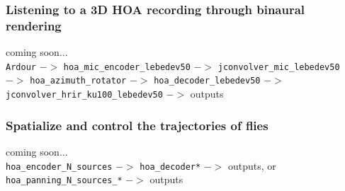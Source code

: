 \documentclass[10pt,a4paper]{article}
\begin{document}
\subsubsection{Listening to a 3D HOA recording through binaural rendering}
coming soon... \\
\lstinline'Ardour' $->$ \lstinline'hoa_mic_encoder_lebedev50' $->$ \lstinline'jconvolver_mic_lebedev50' $->$ \lstinline'hoa_azimuth_rotator' $->$ \lstinline'hoa_decoder_lebedev50' $->$ \lstinline'jconvolver_hrir_ku100_lebedev50' $->$ outputs
\subsubsection{Spatialize and control the trajectories of flies}
coming soon...\\
\lstinline'hoa_encoder_N_sources' $->$ \lstinline'hoa_decoder*' $->$ outputs, or \\
\lstinline'hoa_panning_N_sources_*' $->$ outputs


\end{document}
